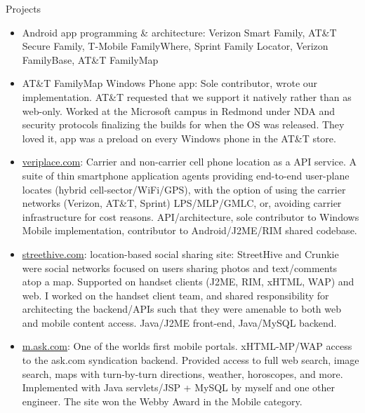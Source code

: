 \medskip
\bigskip


\begin{bf} \large
Projects
\end{bf}
	   	   
	   \begin{itemize}
		\item Android app programming \& architecture: 
		Verizon Smart Family,
		AT\&T Secure Family, 
		T-Mobile FamilyWhere,
		Sprint Family Locator,
		Verizon FamilyBase,
		AT\&T FamilyMap   \\[-16pt]
		\item AT\&T FamilyMap Windows Phone app: Sole contributor, wrote our 
			implementation. AT\&T requested that we support it natively rather than as web-only. 
			Worked at the Microsoft campus in Redmond under NDA and security protocols
			finalizing the builds for when the OS was released.
			They loved it, app was a preload on every Windows phone in the AT\&T store. \\[-16pt]

		\item \url{veriplace.com}: Carrier and non-carrier cell phone location as a API service. 
		A suite of thin smartphone application agents providing
		end-to-end user-plane locates (hybrid cell-sector/WiFi/GPS), with the option of using the 
		carrier networks (Verizon, AT\&T, Sprint) LPS/MLP/GMLC, or, avoiding carrier infrastructure for cost reasons.
		API/architecture, sole contributor to Windows Mobile implementation, contributor to Android/J2ME/RIM
		shared codebase.

		\item \url{streethive.com}: location-based social sharing site: StreetHive and Crunkie were social networks 
		focused on users sharing photos and text/comments atop a map. Supported on 
		handset clients (J2ME, RIM, xHTML, WAP) and web.  
		I worked on the handset client team, and shared responsibility for architecting the backend/APIs such that
		they were amenable to both web and 
		mobile content access. Java/J2ME front-end, Java/MySQL backend.

		\item \url{m.ask.com}: One of the worlds first mobile portals.  xHTML-MP/WAP access to the ask.com
		syndication backend. Provided access to full web search, 
		image search, maps with turn-by-turn directions, weather, horoscopes, and more. 
		Implemented with Java servlets/JSP + MySQL 
		by myself and one other engineer.  The site won the Webby Award in the Mobile category.


\end{itemize}
